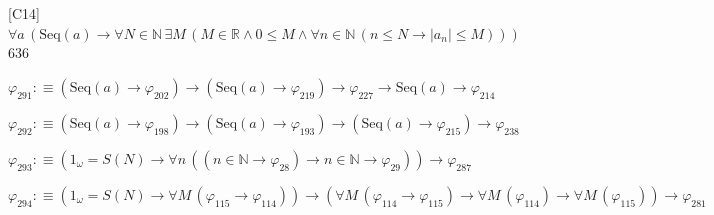\begin{fullproof}{[C14]}{$\forall a\,(\mathrm{Seq}(a) \to \forall N \in \mathbb{N}\,\exists M\,(M \in \mathbb{R} \land 0 \leq M \land \forall n \in \mathbb{N}\,(n \leq N \to \lvert a_{n} \rvert \leq M)))$}{636}
\begin{abbrevlist}
\item $\varphi_{291} :\equiv (\mathrm{Seq}(a) \to \varphi_{202}) \to (\mathrm{Seq}(a) \to \varphi_{219}) \to \varphi_{227} \to \mathrm{Seq}(a) \to \varphi_{214}$
\item $\varphi_{292} :\equiv (\mathrm{Seq}(a) \to \varphi_{198}) \to (\mathrm{Seq}(a) \to \varphi_{193}) \to (\mathrm{Seq}(a) \to \varphi_{215}) \to \varphi_{238}$
\item $\varphi_{293} :\equiv (1_{\omega} = S(N) \to \forall n\,((n \in \mathbb{N} \to \varphi_{28}) \to n \in \mathbb{N} \to \varphi_{29})) \to \varphi_{287}$
\item $\varphi_{294} :\equiv (1_{\omega} = S(N) \to \forall M\,(\varphi_{115} \to \varphi_{114})) \to (\forall M\,(\varphi_{114} \to \varphi_{115}) \to \forall M\,(\varphi_{114}) \to \forall M\,(\varphi_{115})) \to \varphi_{281}$
\end{abbrevlist}
\end{fullproof}
